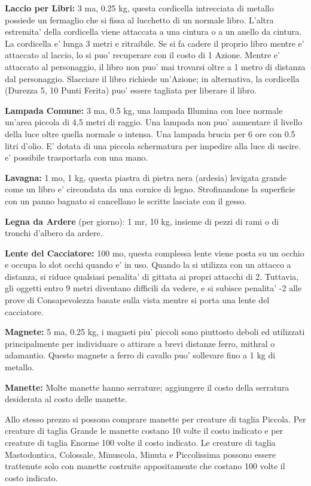 \documentclass[a4paper,11pt,twoside,openany]{book}
\begin{document}
{\textbf{Laccio per Libri:} 3 ma, 0.25 kg, questa cordicella intrecciata di metallo possiede un fermaglio che si fissa al lucchetto di un normale libro. L'altra estremita' della cordicella viene attaccata a una cintura o a un anello da cintura. La cordicella e' lunga 3 metri e ritraibile. Se si fa cadere il proprio libro mentre e' attaccato al laccio, lo si puo' recuperare con il costo di 1 Azione. Mentre e' attaccato al personaggio, il libro non puo' mai trovarsi oltre a 1 metro di distanza dal personaggio. Slacciare il libro richiede un'Azione; in alternativa, la cordicella (Durezza 5, 10 Punti Ferita) puo' essere tagliata per liberare il libro.

\textbf{Lampada Comune:} 3 ma, 0.5 kg, una lampada Illumina con luce normale un'area piccola di 4,5 metri di raggio. Una lampada non puo' aumentare il livello della luce oltre quella normale o intensa. Una lampada brucia per 6 ore con 0.5 litri d'olio. E' dotata di una piccola schermatura per impedire alla luce di uscire. e' possibile trasportarla con una mano.

\textbf{Lavagna:} 1 mo, 1 kg, questa piastra di pietra nera (ardesia) levigata grande come un libro e' circondata da una cornice di legno. Strofinandone la superficie con un panno bagnato si cancellano le scritte lasciate con il gesso.

\textbf{Legna da Ardere} (per giorno): 1 mr, 10 kg, insieme di pezzi di rami o di tronchi d'albero da ardere.

\textbf{Lente del Cacciatore:} 100 mo, questa complessa lente viene posta su un occhio e occupa lo slot occhi quando e' in uso. Quando la si utilizza con un attacco a distanza, si riduce qualsiasi penalita' di gittata ai propri attacchi di 2. Tuttavia, gli oggetti entro 9 metri diventano difficili da vedere, e si subisce penalita' -2 alle prove di Consapevolezza basate sulla vista mentre si porta una lente del cacciatore.

\textbf{Magnete:} 5 ma, 0.25 kg, i magneti piu' piccoli sono piuttosto deboli ed utilizzati principalmente per individuare o attirare a brevi distanze ferro, mithral o adamantio. Questo magnete a ferro di cavallo puo' sollevare fino a 1 kg di metallo. 

\textbf{Manette:} Molte manette hanno serrature; aggiungere il costo della serratura desiderata al costo delle manette.

Allo stesso prezzo si possono comprare manette per creature di taglia Piccola. Per creature di taglia Grande le manette costano 10 volte il costo indicato e per creature di taglia Enorme 100 volte il costo indicato. Le creature di taglia Mastodontica, Colossale, Minuscola, Minuta e Piccolissima possono essere trattenute solo con manette costruite appositamente che costano 100 volte il costo indicato.

}
\end{document}
